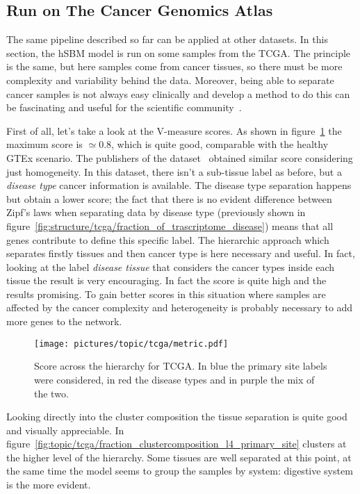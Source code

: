 \subsection{Run on The Cancer Genomics Atlas}
The same pipeline described so far can be applied at other datasets. In this section, the hSBM model is run on some samples from the TCGA. The principle is the same, but here samples come from cancer tissues, so there must be more complexity and variability behind the data. Moreover, being able to separate cancer samples is not always easy clinically and develop a method to do this can be fascinating and useful for the scientific community~\cite{Farver2018}. 

First of all, let's take a look at the V-measure scores. As shown in figure~\ref{fig:topic/tcga/metric} the maximum score is $\simeq 0.8$, which is quite good, comparable with the healthy GTEx scenario. The publishers of the dataset~\cite{Farver2018} obtained similar score considering just homogeneity. In this dataset, there isn't a sub-tissue label as before, but a \textit{disease type} cancer information is available. The disease type separation happens but obtain a lower score; the fact that there is no evident difference between Zipf's laws when separating data by disease type (previously shown in figure~\ref{fig:structure/tcga/fraction_of_trascriptome_disease}) means that all genes contribute to define this specific label. The hierarchic approach which separates firstly tissues and then cancer type is here necessary and useful. In fact, looking at the label \textit{disease tissue} that considers the cancer types inside each tissue the result is very encouraging. In fact the score is quite high and the results promising. To gain better scores in this situation where samples are affected by the cancer complexity and heterogeneity is probably necessary to add more genes to the network. 
\begin{figure}[htb!]
    \centering
    \texttt{[image: pictures/topic/tcga/metric.pdf]}
    \caption{Score across the hierarchy for TCGA. In blue the primary site labels were considered, in red the disease types and in purple the mix of the two.}
    \label{fig:topic/tcga/metric}
\end{figure}
\FloatBarrier
Looking directly into the cluster composition the tissue separation is quite good and visually appreciable. In figure~\ref{fig:topic/tcga/fraction_clustercomposition_l4_primary_site} clusters at the higher level of the hierarchy. Some tissues are well separated at this point, at the same time the model seems to group the samples by system: digestive system is the more evident.

